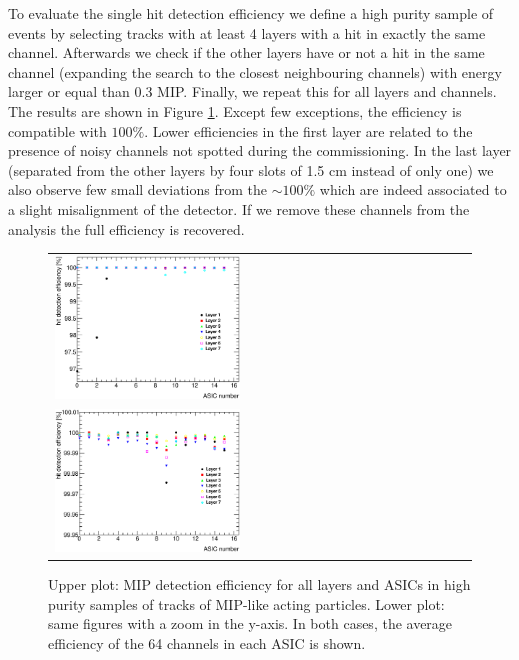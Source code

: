 \documentclass[final,3p,times,twocolumn]{elsarticle}
\begin{document}
To evaluate 
the single hit detection efficiency we define a high purity sample of
events by selecting
tracks with at least 4 layers with a hit in exactly the same channel. Afterwards we 
check if the other layers have or not a hit in the same channel (expanding the search
to the closest neighbouring channels) with energy larger or equal than 0.3 MIP.
Finally, we repeat this for all layers 
and channels. The results are shown in Figure \ref{efficiency}. Except few exceptions, the efficiency is 
compatible with $100\%$.
Lower efficiencies in the first layer are related to the presence of
noisy channels not spotted during the commissioning. In the last layer (separated from the
other layers by four slots of 1.5 cm instead of only one) we also observe few small deviations
from the $\sim100\%$ which are indeed
associated to a slight misalignment of the detector.
If we remove these channels from the analysis
the full efficiency is recovered.

\begin{figure}[!t]
  \centering 
    \begin{tabular}{l}
      \includegraphics[width=0.45\textwidth]{../figs/MIP/efficiency_nhits4_chips.eps} \\
      \includegraphics[width=0.45\textwidth]{../figs/MIP/efficiency_nhits4_chips_zoom.eps} 
    \end{tabular}
    \caption{Upper plot: MIP detection efficiency for all layers and ASICs in high purity samples of tracks of MIP-like acting particles. Lower plot: same figures with a zoom in the y-axis. In both cases, the average efficiency of the 64 channels in each ASIC is shown.}
\label{efficiency}
\end{figure}
\end{document}
